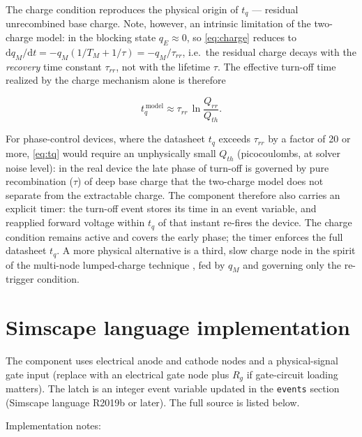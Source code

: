 \documentclass[11pt,a4paper]{article}
\begin{document}
The charge condition reproduces the physical origin of $t_q$ --- residual
unrecombined base charge. Note, however, an intrinsic limitation of the
two-charge model: in the blocking state $q_E \approx 0$, so
\eqref{eq:charge} reduces to
$\mathrm{d}q_M/\mathrm{d}t = -q_M(1/T_M + 1/\tau) = -q_M/\tau_{rr}$, i.e.\
the residual charge decays with the \emph{recovery} time constant
$\tau_{rr}$, not with the lifetime $\tau$. The effective turn-off time
realized by the charge mechanism alone is therefore

\begin{equation}
  t_q^{\,\text{model}} \approx \tau_{rr} \, \ln\!\frac{Q_{rr}}{Q_{th}}.
  \label{eq:tq}
\end{equation}

For phase-control devices, where the datasheet $t_q$ exceeds $\tau_{rr}$ by
a factor of 20 or more, \eqref{eq:tq} would require an unphysically small
$Q_{th}$ (picocoulombs, at solver noise level): in the real device the late
phase of turn-off is governed by pure recombination ($\tau$) of deep base
charge that the two-charge model does not separate from the extractable
charge. The component therefore also carries an explicit timer: the
turn-off event stores its time in an event variable, and reapplied forward
voltage within $t_q$ of that instant re-fires the device. The charge
condition remains active and covers the early phase; the timer enforces the
full datasheet $t_q$. A more physical alternative is a third, slow charge
node in the spirit of the multi-node lumped-charge technique
\cite{ma1997}, fed by $q_M$ and governing only the re-trigger condition.

\section{Simscape language implementation}

The component uses electrical anode and cathode nodes and a physical-signal
gate input (replace with an electrical gate node plus $R_g$ if gate-circuit
loading matters). The latch is an integer event variable updated in the
\texttt{events} section (Simscape language R2019b or later). The full source
is listed below.



Implementation notes:
\end{document}
